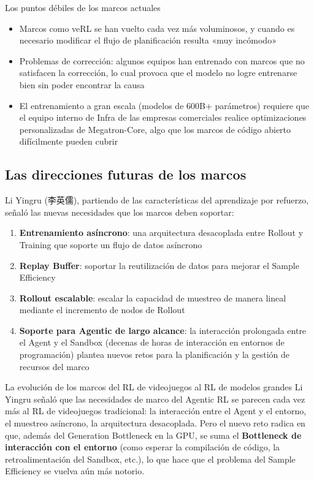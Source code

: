 \begin{warningbox}{Los puntos débiles de los marcos actuales}
\begin{itemize}
    \item Marcos como veRL se han vuelto cada vez más voluminosos, y cuando es necesario modificar el flujo de planificación resulta «muy incómodo»
    \item Problemas de corrección: algunos equipos han entrenado con marcos que no satisfacen la corrección, lo cual provoca que el modelo no logre entrenarse bien sin poder encontrar la causa
    \item El entrenamiento a gran escala (modelos de 600B+ parámetros) requiere que el equipo interno de Infra de las empresas comerciales realice optimizaciones personalizadas de Megatron-Core, algo que los marcos de código abierto difícilmente pueden cubrir
\end{itemize}
\end{warningbox}

\subsection{Las direcciones futuras de los marcos}

Li Yingru (李英儒), partiendo de las características del aprendizaje por refuerzo, señaló las nuevas necesidades que los marcos deben soportar:

\begin{enumerate}
    \item \textbf{Entrenamiento asíncrono}: una arquitectura desacoplada entre Rollout y Training que soporte un flujo de datos asíncrono
    \item \textbf{Replay Buffer}: soportar la reutilización de datos para mejorar el Sample Efficiency
    \item \textbf{Rollout escalable}: escalar la capacidad de muestreo de manera lineal mediante el incremento de nodos de Rollout
    \item \textbf{Soporte para Agentic de largo alcance}: la interacción prolongada entre el Agent y el Sandbox (decenas de horas de interacción en entornos de programación) plantea nuevos retos para la planificación y la gestión de recursos del marco
\end{enumerate}

\begin{knowledgebox}{La evolución de los marcos del RL de videojuegos al RL de modelos grandes}
Li Yingru señaló que las necesidades de marco del Agentic RL se parecen cada vez más al RL de videojuegos tradicional: la interacción entre el Agent y el entorno, el muestreo asíncrono, la arquitectura desacoplada. Pero el nuevo reto radica en que, además del Generation Bottleneck en la GPU, se suma el \textbf{Bottleneck de interacción con el entorno} (como esperar la compilación de código, la retroalimentación del Sandbox, etc.), lo que hace que el problema del Sample Efficiency se vuelva aún más notorio.
\end{knowledgebox}

